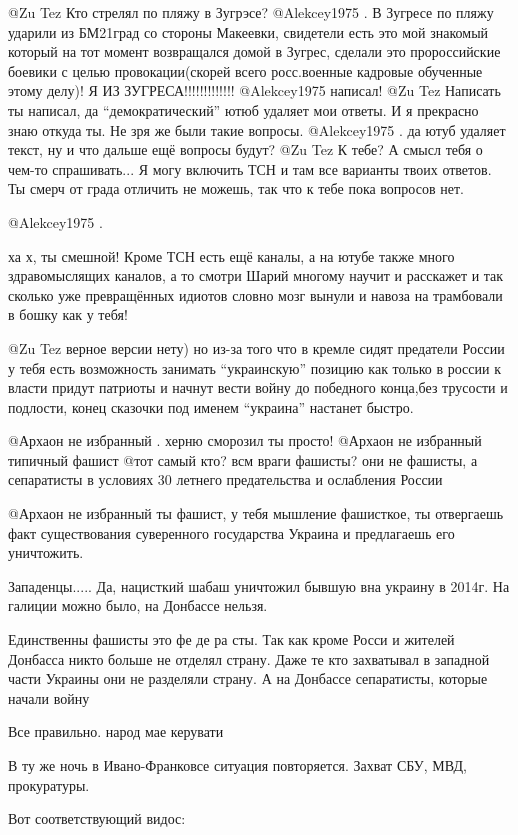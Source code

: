 \begin{multicols}{2}
\begin{itemize}
 @Zu Tez  Кто стрелял по пляжу в Зугрэсе?
 @Alekcey1975  . В Зугресе по пляжу ударили из  БМ21град со стороны Макеевки, свидетели есть это мой знакомый который на тот момент возвращался домой в Зугрес, сделали это пророссийские боевики с целью провокации(скорей всего росс.военные кадровые обученные этому делу)! Я ИЗ ЗУГРЕСА!!!!!!!!!!!!!
 @Alekcey1975  написал!
 @Zu Tez  Написать ты написал, да \enquote{демократический} ютюб удаляет мои
 ответы. И я прекрасно знаю откуда ты. Не зря же были такие вопросы.
 @Alekcey1975 . да ютуб удаляет текст, ну и что дальше ещё вопросы будут?
 @Zu Tez  К тебе? А смысл тебя о чем-то спрашивать... Я могу включить ТСН и там
 все варианты твоих ответов. Ты смерч от града отличить не можешь, так что к
 тебе пока вопросов нет. 

 @Alekcey1975  . 

ха х, ты смешной! Кроме ТСН есть ещё каналы, а на ютубе также много
здравомыслящих каналов, а то смотри Шарий многому научит и расскажет и так
сколько уже превращённых  идиотов словно мозг вынули и навоза на трамбовали в
бошку как у тебя!

 @Zu Tez  верное версии нету) но из-за того что в кремле сидят предатели России
 у тебя есть возможность занимать \enquote{украинскую} позицию как только в россии к
 власти придут патриоты и начнут вести войну до победного конца,без трусости и
 подлости, конец сказочки под именем \enquote{украина} настанет быстро.

 @Архаон не избранный  . херню сморозил ты просто!
 @Архаон не избранный  типичный фашист
 @тот самый  кто? всм враги фашисты? они не фашисты, а сепаратисты в условиях 30
 летнего предательства  и ослабления России 


@Архаон не избранный  ты фашист, у тебя мышление фашисткое, ты отвергаешь факт
существования суверенного государства Украина и предлагаешь его уничтожить. 

\end{itemize} %

Западенцы.....
Да, нацисткий шабаш уничтожил бывшую вна украину в 2014г. На галиции можно было, на Донбассе нельзя. 

\begin{itemize} %

Единственны фашисты это фе  де   ра   сты. Так как кроме Росси и жителей
Донбасса никто больше не отделял страну. Даже те кто захватывал в западной
части Украины они не разделяли страну. А на Донбассе сепаратисты, которые
начали войну 

\end{itemize} %

Все правильно. народ мае керувати 

\end{multicols} %

В ту же ночь в Ивано-Франковсе ситуация повторяется. Захват СБУ, МВД,
прокуратуры.

Вот соответствующий видос:
